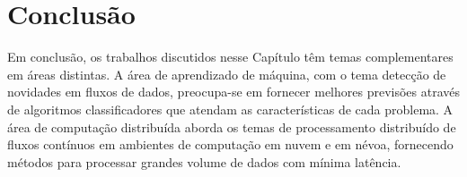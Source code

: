 \newcommand{\stream}{\emph{data stream}\xspace}
\newcommand{\streams}{\emph{data streams}\xspace}
\newcommand{\streamMining}{\emph{data stream mining}\xspace}

\section{Conclusão}\label{sec:conclusao-relacionados}


Em conclusão, os trabalhos discutidos nesse Capítulo têm temas complementares em
áreas distintas.
A área de aprendizado de máquina, com o tema detecção de novidades em fluxos de
dados, preocupa-se em fornecer melhores previsões através de algoritmos
classificadores que atendam as características de cada problema.
A área de computação distribuída aborda os temas de processamento distribuído
de fluxos contínuos em ambientes de computação em nuvem e em névoa, fornecendo
métodos para processar grandes volume de dados com mínima latência.

